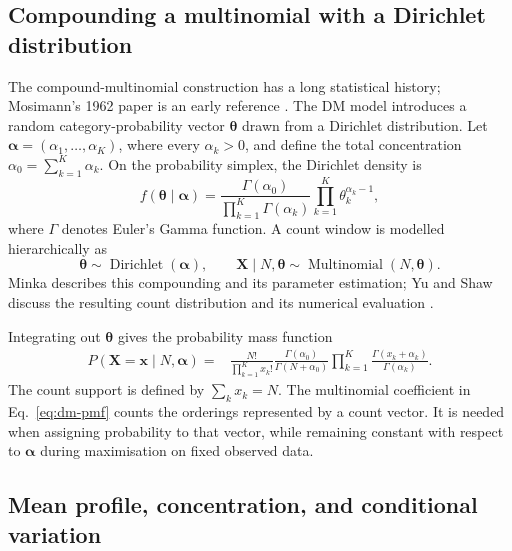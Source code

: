 \subsection{Compounding a multinomial with a Dirichlet distribution}

The compound-multinomial construction has a long statistical history;
Mosimann's 1962 paper is an early reference \cite{mosimann1962}.
The DM model introduces a random category-probability vector
$\boldsymbol{\theta}$ drawn from a Dirichlet distribution. Let
$\boldsymbol{\alpha}=(\alpha_1,\ldots,\alpha_K)$, where every
$\alpha_k>0$, and define the total concentration
$\alpha_0=\sum_{k=1}^{K}\alpha_k$. On the probability simplex, the
Dirichlet density is
\[
  f(\boldsymbol{\theta}\mid\boldsymbol{\alpha})
  =\frac{\Gamma(\alpha_0)}{\prod_{k=1}^{K}\Gamma(\alpha_k)}
    \prod_{k=1}^{K}\theta_k^{\alpha_k-1},
\]
where $\Gamma$ denotes Euler's Gamma function. A count window is modelled
hierarchically as
\[
  \boldsymbol{\theta}\sim\operatorname{Dirichlet}(\boldsymbol{\alpha}),
  \qquad
  \boldsymbol{X}\mid N,\boldsymbol{\theta}
    \sim\operatorname{Multinomial}(N,\boldsymbol{\theta}).
\]
Minka describes this compounding and its parameter estimation; Yu and
Shaw discuss the resulting count distribution and its numerical
evaluation \cite{minka2000,yu2014}.

Integrating out $\boldsymbol{\theta}$ gives the probability mass function
\begin{equation}
\begin{split}
  P(\boldsymbol{X}=\boldsymbol{x}\mid N,\boldsymbol{\alpha})
  ={}&\frac{N!}{\prod_{k=1}^{K}x_k!}
      \frac{\Gamma(\alpha_0)}{\Gamma(N+\alpha_0)}
      \prod_{k=1}^{K}
      \frac{\Gamma(x_k+\alpha_k)}{\Gamma(\alpha_k)}.
\end{split}
\label{eq:dm-pmf}
\end{equation}
The count support is defined by $\sum_k x_k=N$. The multinomial
coefficient in Eq.~\eqref{eq:dm-pmf} counts the orderings represented by a
count vector. It is needed when assigning probability to that vector,
while remaining constant with respect to $\boldsymbol{\alpha}$ during
maximisation on fixed observed data.

\subsection{Mean profile, concentration, and conditional variation}

